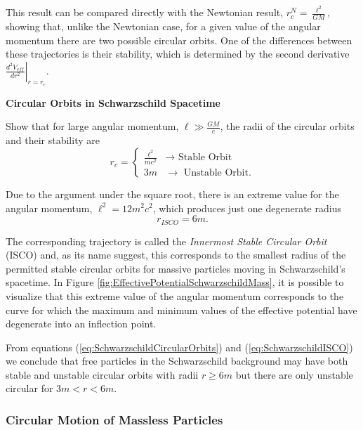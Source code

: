 This result can be compared directly with the Newtonian result, $r_c^N =  \frac{\ell^2}{GM}$, showing that, unlike the Newtonian case, for a given value of the angular momentum there are two possible circular orbits. One of the differences between these trajectories is their stability, which is determined by the second derivative $\left. \frac{d^2 V_{eff} }{dr^2} \right|_{r=r_c}$. 
 \begin{exercise}
 \textbf{Circular Orbits in Schwarzschild Spacetime}
 
 Show that for large angular momentum, $\ell \gg \frac{GM}{c}$, the radii of the circular orbits and their stability are
 \begin{equation}
 r_c = \begin{cases}
 \frac{\ell^2}{mc^2} & \rightarrow \textrm{ Stable Orbit}\\
 3m & \rightarrow \textrm{ Unstable Orbit}.
 \end{cases} \label{eq:SchwarzschildCircularOrbits}
 \end{equation}
 \end{exercise}
 
Due to the argument under the square root, there is an extreme value for the angular momentum, $\ell ^2 = 12 m^2c^2$, which produces just one degenerate radius 
 \begin{equation}
 r_{ISCO} = 6m \label{eq:SchwarzschildISCO}.
 \end{equation}

The corresponding trajectory is called the \textit{Innermost Stable Circular Orbit} (ISCO) and, as its name suggest, this corresponds to the smallest radius of the permitted stable circular orbits for massive particles moving in Schwarzschild's spacetime. In Figure \ref{fig:EffectivePotentialSchwarzschildMass}, it is possible to visualize that this extreme value of the angular momentum corresponds to the curve  for which the maximum and minimum values of the effective potential have degenerate into an inflection point.  
 
From equations (\ref{eq:SchwarzschildCircularOrbits}) and (\ref{eq:SchwarzschildISCO}) we conclude that free particles in the Schwarzschild background may have both stable and unstable circular orbits with radii $r \geq 6m$ but there are only unstable circular for $3m<r<6m$.

\subsubsection{Circular Motion of Massless Particles}

